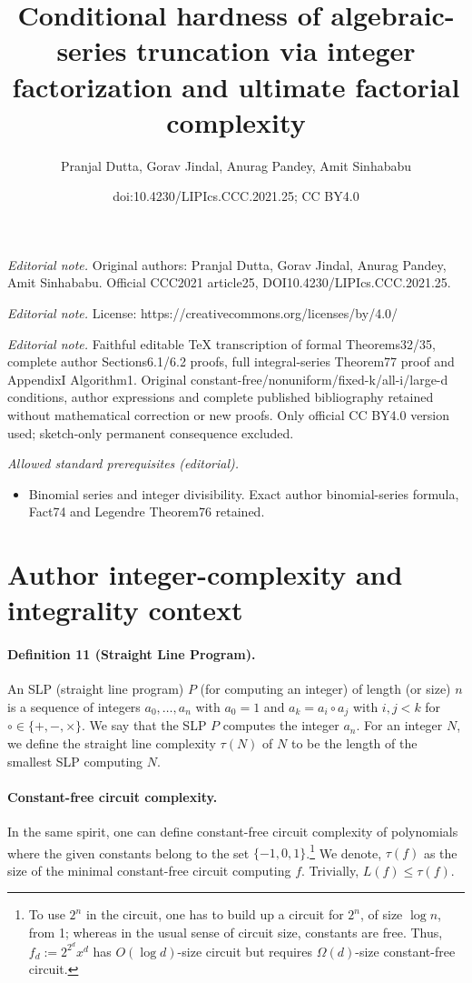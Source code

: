 \documentclass[10pt,a4paper]{article}
\title{Conditional hardness of algebraic-series truncation via integer factorization and ultimate factorial complexity}
\author{Pranjal Dutta, Gorav Jindal, Anurag Pandey, Amit Sinhababu}
\date{doi:10.4230/LIPIcs.CCC.2021.25; CC BY4.0}
\begin{document}
\maketitle
\noindent\textit{Editorial note.} Original authors: Pranjal Dutta, Gorav Jindal, Anurag Pandey, Amit Sinhababu. Official CCC2021 article25, DOI10.4230/LIPIcs.CCC.2021.25.\par\medskip
\noindent\textit{Editorial note.} License: https://creativecommons.org/licenses/by/4.0/\par\medskip
\noindent\textit{Editorial note.} Faithful editable TeX transcription of formal Theorems32/35, complete author Sections6.1/6.2 proofs, full integral-series Theorem77 proof and AppendixI Algorithm1. Original constant-free/nonuniform/fixed-k/all-i/large-d conditions, author expressions and complete published bibliography retained without mathematical correction or new proofs. Only official CC BY4.0 version used; sketch-only permanent consequence excluded.\par\medskip
\noindent\textit{Allowed standard prerequisites (editorial).}\begin{itemize}
\item Binomial series and integer divisibility. Exact author binomial-series formula, Fact74 and Legendre Theorem76 retained.
\end{itemize}\medskip
\section*{Author integer-complexity and integrality context}
\paragraph{Definition 11 (Straight Line Program).} An SLP (straight line program) $P$ (for computing an integer) of length (or size) $n$ is a sequence of integers $a_0,\ldots,a_n$ with $a_0=1$ and $a_k=a_i\circ a_j$ with $i,j<k$ for $\circ\in\{+,-,\times\}$. We say that the SLP $P$ computes the integer $a_n$. For an integer $N$, we define the straight line complexity $\tau(N)$ of $N$ to be the length of the smallest SLP computing $N$.
\paragraph{Constant-free circuit complexity.} In the same spirit, one can define constant-free circuit complexity of polynomials where the given constants belong to the set $\{-1,0,1\}$.\footnote{To use $2^n$ in the circuit, one has to build up a circuit for $2^n$, of size $\log n$, from 1; whereas in the usual sense of circuit size, constants are free. Thus, $f_d:=2^{2^d}x^d$ has $O(\log d)$-size circuit but requires $\Omega(d)$-size constant-free circuit.} We denote, $\tau(f)$ as the size of the minimal constant-free circuit computing $f$. Trivially, $L(f)\le\tau(f)$.
\end{document}

